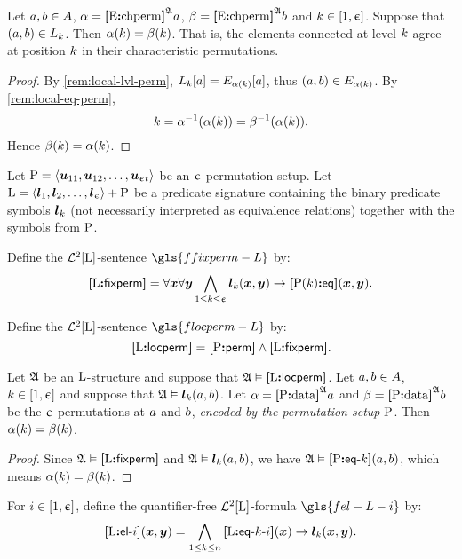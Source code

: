 \begin{remark}\label{rem:local-lvl-agree}
Let $a, b \in A$, $\alpha = {\bm{[}\mathrm{E}\mathord{\bm{:}}\mathrm{chperm}\bm{]}}^{\mathfrak{A}}a$,
$\beta = {\bm{[}\mathrm{E}\mathord{\bm{:}}\mathrm{chperm}\bm{]}}^{\mathfrak{A}}b$ and $k \in [1,\upepsilon]$.
Suppose that $(a, b) \in L_{k}$.
Then $\alpha(k) = \beta(k)$.
That is, the elements connected at level $k$ agree at position $k$ in their
characteristic permutations.
\end{remark}
\begin{proof}
By \cref{rem:local-lvl-perm}, $L_{k}[a] = E_{\alpha(k)}[a]$, thus
$(a, b) \in E_{\alpha(k)}$. 
By \cref{rem:local-eq-perm},
\[
  k = \alpha^{-1}(\alpha(k)) = \beta^{-1}(\alpha(k)).
\]
Hence $\beta(k) = \alpha(k)$.
\end{proof}

Let $\mathrm{P} = \left\langle \bm{u}_{11}, \bm{u}_{12}, \dots, \bm{u}_{\upepsilon t} \right\rangle$ be an
$\upepsilon$-permutation setup.
Let $\mathrm{L} = \left\langle \bm{l}_{1}, \bm{l}_{2}, \dots, \bm{l}_{\upepsilon} \right\rangle + \mathrm{P}$ be a predicate
signature containing the binary predicate symbols $\bm{l}_{k}$ (not necessarily
interpreted as equivalence relations) together with the symbols from $\mathrm{P}$.
\begin{definition}
Define the $\mathcal{L}^{2}[\mathrm{L}]$-sentence $\gls{ffixperm-L}$ by:
\[
  {\bm{[}\mathrm{L}\mathord{\bm{:}}\mathsf{fixperm}\bm{]}} = \forall\bm{x} \forall\bm{y} \bigwedge_{1 \leq k \leq \upepsilon}
  \bm{l}_{k}(\bm{x},\bm{y}) \rightarrow {\bm{[}\mathrm{P}(k)\mathord{\bm{:}}\mathsf{eq}\bm{]}}(\bm{x},\bm{y}).
\]
\end{definition}
\begin{definition}
Define the $\mathcal{L}^{2}[\mathrm{L}]$-sentence $\gls{flocperm-L}$ by:
\[
  {\bm{[}\mathrm{L}\mathord{\bm{:}}\mathsf{locperm}\bm{]}} = {\bm{[}\mathrm{P}\mathord{\bm{:}}\mathsf{perm}\bm{]}} \land {\bm{[}\mathrm{L}\mathord{\bm{:}}\mathsf{fixperm}\bm{]}}.
\]
\end{definition}
\begin{remark}\label{rem:local-perm-val-fixed}
Let $\mathfrak{A}$ be an $\mathrm{L}$-structure and suppose that $\mathfrak{A} \vDash {\bm{[}\mathrm{L}\mathord{\bm{:}}\mathsf{locperm}\bm{]}}$.
Let $a, b \in A$, $k \in [1,\upepsilon]$ and suppose that
$\mathfrak{A} \vDash \bm{l}_{k}(a, b)$.
Let $\alpha = {\bm{[}\mathrm{P}\mathord{\bm{:}}\mathrm{data}\bm{]}}^{\mathfrak{A}}a$ and $\beta = {\bm{[}\mathrm{P}\mathord{\bm{:}}\mathrm{data}\bm{]}}^{\mathfrak{A}}b$ be the
$\upepsilon$-permutations at $a$ and $b$,
\emph{encoded by the permutation setup $\mathrm{P}$}.
Then $\alpha(k) = \beta(k)$.
\end{remark}
\begin{proof}
Since $\mathfrak{A} \vDash {\bm{[}\mathrm{L}\mathord{\bm{:}}\mathsf{fixperm}\bm{]}}$ and $\mathfrak{A} \vDash \bm{l}_{k}(a,b)$, we have
$\mathfrak{A} \vDash {\bm{[}\mathrm{P}\mathord{\bm{:}}\mathsf{eq}{\hbox{-}}k\bm{]}}(a,b)$, which means $\alpha(k) = \beta(k)$.
\end{proof}

\begin{definition}
For $i \in [1,\upepsilon]$, define the quantifier-free $\mathcal{L}^{2}[\mathrm{L}]$-formula
$\gls{fel-L-i}$ by:
\[
  {\bm{[}\mathrm{L}\mathord{\bm{:}}\mathsf{el}{\hbox{-}}i\bm{]}}(\bm{x},\bm{y}) = \bigwedge_{1 \leq k \leq n}
  {\bm{[}\mathrm{L}\mathord{\bm{:}}\mathsf{eq}{\hbox{-}}k{\hbox{-}}i\bm{]}}(\bm{x}) \rightarrow \bm{l}_{k}(\bm{x},\bm{y}).
\]
\end{definition}


